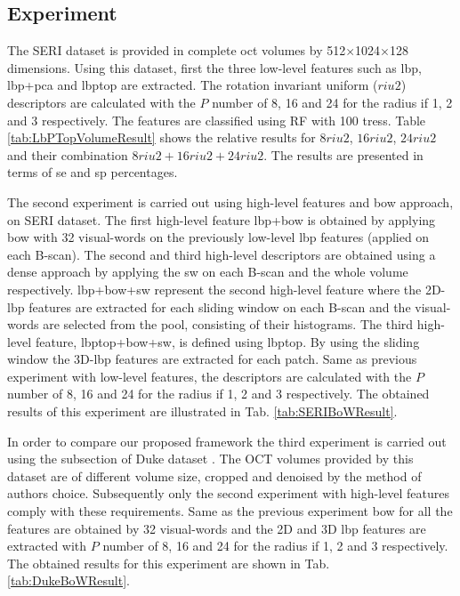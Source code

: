 \subsection{Experiment}
The SERI dataset is provided in complete \ac{oct} volumes by 512$\times$1024$\times$128 dimensions. Using this dataset, first the three low-level features such as \ac{lbp}, \ac{lbp}+\ac{pca} and \ac{lbptop} are extracted. The rotation invariant uniform ($riu2$) descriptors are calculated with the $P$ number of 8, 16 and 24 for the radius if 1, 2 and 3 respectively. The features are classified using RF with 100 tress. Table \ref{tab:LbPTopVolumeResult} shows the relative results for $8riu2$, $16riu2$, $24riu2$ and their combination $8riu2 + 16riu2 + 24riu2$. The results are presented in terms of \ac{se} and \ac{sp} percentages.  

The second experiment is carried out using high-level features and \ac{bow} approach, on SERI dataset. The first high-level feature \ac{lbp}+\ac{bow} is obtained by applying \ac{bow} with 32 visual-words on the previously low-level \ac{lbp} features (applied on each B-scan). The second and third high-level descriptors are obtained using a dense approach by applying the \ac{sw} on each B-scan and the whole volume respectively. \ac{lbp}+\ac{bow}+\ac{sw} represent the second high-level feature where the 2D-\ac{lbp} features are extracted for each sliding window on each B-scan and the visual-words are selected from the pool, consisting of their histograms. The third high-level feature, \ac{lbptop}+\ac{bow}+\ac{sw}, is defined using \ac{lbptop}. By using the sliding window the 3D-\ac{lbp} features are extracted for each patch. Same as previous experiment with low-level features, the descriptors are calculated with the $P$ number of 8, 16 and 24 for the radius if 1, 2 and 3 respectively. The obtained results of this experiment are illustrated in Tab. \ref{tab:SERIBoWResult}. 

In order to compare our proposed framework the third experiment is carried out using the subsection of Duke dataset \cite{Srinivasan2014}. The OCT volumes provided by this dataset are of different volume size, cropped and denoised by the method of authors choice. Subsequently only the second experiment with high-level features comply with these requirements. Same as the previous experiment \ac{bow} for all the features are obtained by 32 visual-words and the 2D and 3D \ac{lbp} features are extracted with $P$ number of 8, 16 and 24 for the radius if 1, 2 and 3 respectively. The obtained results for this experiment are shown in Tab. \ref{tab:DukeBoWResult}.

